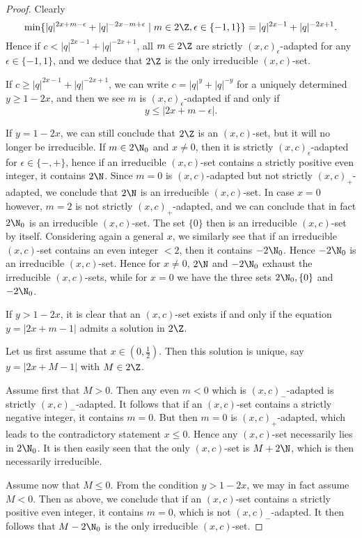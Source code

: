 \begin{proof}
Clearly \[\min \{|q|^{2x+m-\epsilon}+|q|^{-2x-m+\epsilon}\mid m\in 2\Z,\epsilon\in \{-1,1\}\} = |q|^{2x-1}+|q|^{-2x+1}.\] Hence if $c< |q|^{2x-1}+|q|^{-2x+1}$, all $m\in 2\Z$ are strictly $(x,c)_{\epsilon}$-adapted for any $\epsilon\in \{-1,1\}$, and we deduce that $2\Z$ is the only irreducible $(x,c)$-set.

If $c\geq |q|^{2x-1}+|q|^{-2x+1}$, we can write $c=|q|^y+|q|^{-y}$ for a uniquely determined $y\geq 1-2x$, and then we see $m$ is $(x,c)_{\epsilon}$-adapted if and only if \[ y \leq |2x+m-\epsilon|.\]

If $y=1-2x$, we can still conclude that $2\Z$ is an $(x,c)$-set, but it will no longer be irreducible. If $m\in 2\N_0$ and $x\neq 0$, then it is strictly $(x,c)_{\epsilon}$-adapted for $\epsilon\in \{-,+\}$, hence if an irreducible $(x,c)$-set contains a strictly positive even integer, it contains $2\N$. Since $m=0$ is $(x,c)$-adapted but not strictly $(x,c)_+$-adapted, we conclude that $2\N$ is an irreducible $(x,c)$-set. In case $x=0$ however, $m=2$ is not strictly $(x,c)_+$-adapted, and we can conclude that in fact $2\N_0$ is an irreducible $(x,c)$-set. The set $\{0\}$ then is an irreducible $(x,c)$-set by itself. Considering again a general $x$, we similarly see that if an irreducible $(x,c)$-set contains an even integer $<2$, then it contains $-2\N_0$. Hence $-2\N_0$ is an irreducible $(x,c)$-set. Hence for $x\neq 0$,  $2\N$ and $-2\N_0$ exhaust the irreducible $(x,c)$-sets, while for $x=0$ we have the three sets $2\N_0,\{0\}$ and $-2\N_0$.

If $y>1-2x$, it is clear that an $(x,c)$-set exists if and only if the equation $y=|2x+m-1|$ admits a solution in $2\Z$. 

Let us first assume that $x\in (0,\frac{1}{2})$. Then this solution is unique, say $y=|2x+M-1|$ with $M\in 2\Z$. 

Assume first that $M>0$. Then any even $m< 0$ which is $(x,c)_-$-adapted is strictly $(x,c)_{-}$-adapted. It follows that if an $(x,c)$-set contains a strictly negative integer, it contains $m=0$. But then $m=0$ is $(x,c)_+$-adapted, which leads to the contradictory statement $x\leq0$. Hence any $(x,c)$-set necessarily lies in $2\N_0$. It is then easily seen that the only $(x,c)$-set is $M+2\N$, which is then necessarily irreducible.

Assume now that $M\leq 0$. From the condition $y>1-2x$, we may in fact assume $M<0$. Then as above, we conclude that if an $(x,c)$-set contains a strictly positive even integer, it contains $m=0$, which is not $(x,c)_-$-adapted. It then follows that $M-2\N_0$ is the only irreducible $(x,c)$-set.


\end{proof}

